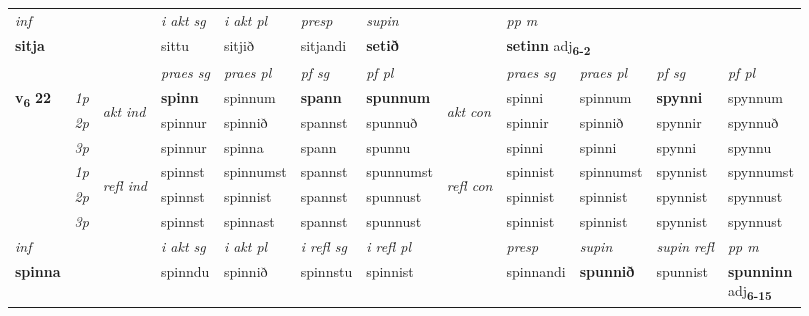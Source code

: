 \begin{longtable}[l]{X>{\footnotesize\itshape}llXXXXlXXXX}
   {\textit{inf}} & &  & \textit{i akt sg} & \textit{i akt pl}   & \textit{presp} & \textit{supin}  && \textit{pp m} \\*
  {\textbf{sitja}} & && sittu  & sitjið   & sitjandi &  \textbf{setið}  && \multicolumn{2}{l}{\textbf{setinn} adj\textbf{\textsubscript{6-2}}} \\*

\midrule

 & &   & \textit{praes sg}  & \textit{praes pl}    & \textit{ pf sg} & \textit{pf pl} & & \textit{praes sg}  & \textit{praes pl}    & \textit{pf sg} & \textit{pf pl }  \\ \cmidrule{4-7} \cmidrule{9-12}
 \multirow{2}{*}{{{\textbf{v{\textsubscript{6}}} \Large{\textbf{22}}}}}  & 1p & \multirow{3}{*}{\begin{turn}{90}\textit{akt ind}\end{turn}} & \textbf{spinn} & spinnum & \textbf{spann} & \textbf{spunnum} & \multirow{3}{*}{\begin{turn}{90}\textit{akt con}\end{turn}} &spinni & spinnum & \textbf{spynni} & spynnum\\*
 & 2p &  &  spinnur  & spinnið & spannst & spunnuð & & spinnir & spinnið & spynnir & spynnuð \\*
 & 3p &  & spinnur & spinna & spann & spunnu & & spinni & spinni& spynni & spynnu \\*
\cmidrule{4-7} \cmidrule{9-12}
 & 1p & \multirow{3}{*}{\begin{turn}{90}\textit{refl ind}\end{turn}}  & spinnst & spinnumst & spannst & spunnumst & \multirow{3}{*}{\begin{turn}{90}\textit{refl con}\end{turn}}  &spinnist & spinnumst & spynnist & spynnumst \\*
 & 2p &  & spinnst & spinnist & spannst & spunnust & &spinnist & spinnist & spynnist & spynnust \\*
 & 3p  & & spinnst & spinnast & spannst & spunnust & & spinnist & spinnist& spynnist & spynnust \\*
\cmidrule{4-7} \cmidrule{9-12}

   {\textit{inf}} & &  & \textit{i akt sg} & \textit{i akt pl} & \textit{i refl sg} & \textit{i refl pl} && \textit{presp} & \textit{supin} & \textit{supin refl} & \textit{pp m} \\*
  {\textbf{spinna}} & && spinndu  & spinnið & spinnstu & spinnist && spinnandi &  \textbf{spunnið} & spunnist & \specialcell{\textbf{spunninn} \\ adj\textbf{\textsubscript{6-15}}} \\*


\end{longtable}
